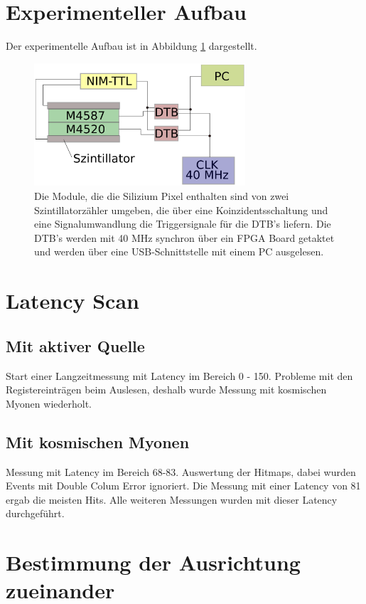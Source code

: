 \documentclass[usenames,dvipsnames]{include/protokollclass}
\begin{document}
	\section{Experimenteller Aufbau}
	Der experimentelle Aufbau ist in Abbildung \ref{fig:aufbau} dargestellt.
	\begin{figure}
		\centering
		\includegraphics[width=0.7\textwidth]{fig/aufbau.eps}
		\caption{Die Module, die die Silizium Pixel enthalten sind von zwei Szintillatorzähler umgeben, die über eine Koinzidentsschaltung und eine Signalumwandlung die Triggersignale für die DTB's liefern. Die DTB's werden mit 40 MHz synchron über ein FPGA Board getaktet und werden über eine USB-Schnittstelle mit einem PC ausgelesen.}
		\label{fig:aufbau}
	\end{figure}

	\section{Latency Scan}
	\subsection{Mit aktiver Quelle}
	Start einer Langzeitmessung mit Latency im Bereich 0 - 150. 
	Probleme mit den Registereinträgen beim Auslesen, deshalb wurde Messung mit kosmischen Myonen wiederholt. 
	\subsection{Mit kosmischen Myonen}
	Messung mit Latency im Bereich 68-83. Auswertung der Hitmaps, dabei wurden Events mit Double Colum Error ignoriert. Die Messung mit einer Latency von 81 ergab die meisten Hits. Alle weiteren Messungen wurden mit dieser Latency durchgeführt.
	
	\section{Bestimmung der Ausrichtung zueinander}
	
\end{document}
